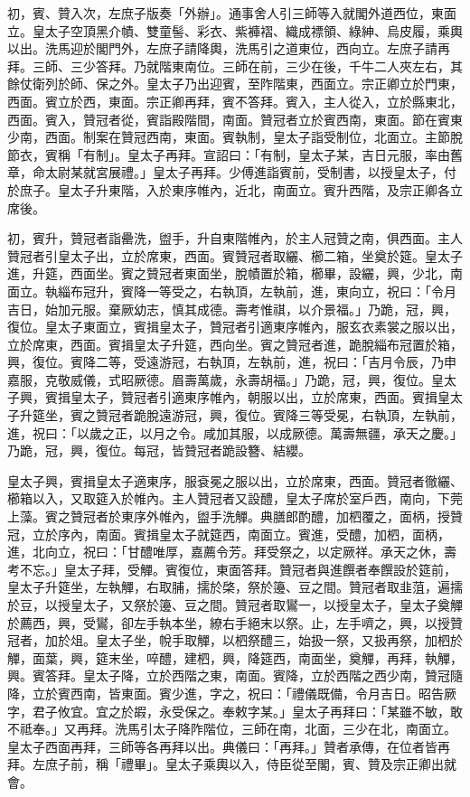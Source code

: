 \begin{pinyinscope}
 初，賓、贊入次，左庶子版奏「外辦」。通事舍人引三師等入就閣外道西位，東面立。皇太子空頂黑介幘、雙童髻、彩衣、紫褲褶、織成褾領、綠紳、烏皮履，乘輿以出。洗馬迎於閣門外，左庶子請降輿，洗馬引之道東位，西向立。左庶子請再拜。三師、三少答拜。乃就階東南位。三師在前，三少在後，千牛二人夾左右，其餘仗衛列於師、保之外。皇太子乃出迎賓，至阼階東，西面立。宗正卿立於門東，西面。賓立於西，東面。宗正卿再拜，賓不答拜。賓入，主人從入，立於縣東北，西面。賓入，贊冠者從，賓詣殿階間，南面。贊冠者立於賓西南，東面。節在賓東少南，西面。制案在贊冠西南，東面。賓執制，皇太子詣受制位，北面立。主節脫節衣，賓稱「有制」。皇太子再拜。宣詔曰：「有制，皇太子某，吉日元服，率由舊章，命太尉某就宮展禮。」皇太子再拜。少傅進詣賓前，受制書，以授皇太子，付於庶子。皇太子升東階，入於東序帷內，近北，南面立。賓升西階，及宗正卿各立席後。



 初，賓升，贊冠者詣罍洗，盥手，升自東階帷內，於主人冠贊之南，俱西面。主人贊冠者引皇太子出，立於席東，西面。賓贊冠者取纚、櫛二箱，坐奠於筵。皇太子進，升筵，西面坐。賓之贊冠者東面坐，脫幘置於箱，櫛畢，設纚，興，少北，南面立。執緇布冠升，賓降一等受之，右執頂，左執前，進，東向立，祝曰：「令月吉日，始加元服。棄厥幼志，慎其成德。壽考惟祺，以介景福。」乃跪，冠，興，復位。皇太子東面立，賓揖皇太子，贊冠者引適東序帷內，服玄衣素裳之服以出，立於席東，西面。賓揖皇太子升筵，西向坐。賓之贊冠者進，跪脫緇布冠置於箱，興，復位。賓降二等，受遠游冠，右執頂，左執前，進，祝曰：「吉月令辰，乃申嘉服，克敬威儀，式昭厥德。眉壽萬歲，永壽胡福。」乃跪，冠，興，復位。皇太子興，賓揖皇太子，贊冠者引適東序帷內，朝服以出，立於席東，西面。賓揖皇太子升筵坐，賓之贊冠者跪脫遠游冠，興，復位。賓降三等受冕，右執頂，左執前，進，祝曰：「以歲之正，以月之令。咸加其服，以成厥德。萬壽無疆，承天之慶。」乃跪，冠，興，復位。每冠，皆贊冠者跪設簪、結纓。



 皇太子興，賓揖皇太子適東序，服袞冕之服以出，立於席東，西面。贊冠者徹纚、櫛箱以入，又取筵入於帷內。主人贊冠者又設醴，皇太子席於室戶西，南向，下莞上藻。賓之贊冠者於東序外帷內，盥手洗觶。典膳郎酌醴，加柶覆之，面柄，授贊冠，立於序內，南面。賓揖皇太子就筵西，南面立。賓進，受醴，加柶，面柄，進，北向立，祝曰：「甘醴唯厚，嘉薦令芳。拜受祭之，以定厥祥。承天之休，壽考不忘。」皇太子拜，受觶。賓復位，東面答拜。贊冠者與進饌者奉饌設於筵前，皇太子升筵坐，左執觶，右取脯，擩於棨，祭於籩、豆之間。贊冠者取韭菹，遍擩於豆，以授皇太子，又祭於籩、豆之間。贊冠者取鸑一，以授皇太子，皇太子奠觶於薦西，興，受鸑，卻左手執本坐，繚右手絕末以祭。止，左手嚌之，興，以授贊冠者，加於俎。皇太子坐，帨手取觶，以柶祭醴三，始扱一祭，又扱再祭，加柶於觶，面葉，興，筵末坐，啐醴，建柶，興，降筵西，南面坐，奠觶，再拜，執觶，興。賓答拜。皇太子降，立於西階之東，南面。賓降，立於西階之西少南，贊冠隨降，立於賓西南，皆東面。賓少進，字之，祝曰：「禮儀既備，令月吉日。昭告厥字，君子攸宜。宜之於嘏，永受保之。奉敕字某。」皇太子再拜曰：「某雖不敏，敢不祗奉。」又再拜。洗馬引太子降阼階位，三師在南，北面，三少在北，南面立。皇太子西面再拜，三師等各再拜以出。典儀曰：「再拜。」贊者承傳，在位者皆再拜。左庶子前，稱「禮畢」。皇太子乘輿以入，侍臣從至閣，賓、贊及宗正卿出就會。




\end{pinyinscope}
